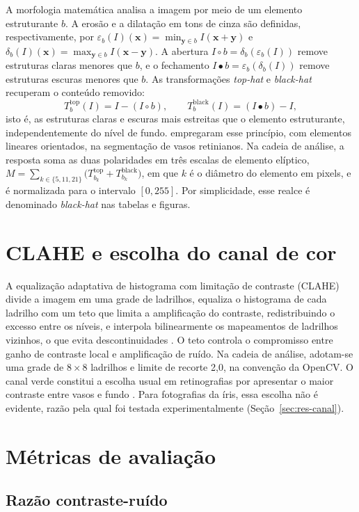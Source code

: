 \documentclass[12pt, oneside, a4paper, chapter=TITLE, section=TITLE,
               english, brazil]{abntex2}
\newcommand{\secao}[1]{\section[\texorpdfstring{\protect\MakeTextUppercase{#1}}{#1}]{#1}}
\newcommand{\bh}{\emph{black-hat}}
\newcommand{\tht}{\emph{top-hat}}
\begin{document}
A morfologia matemática \citep*{Soille2004} analisa a imagem por meio de um
elemento estruturante $b$. A erosão e a dilatação em tons de cinza são
definidas, respectivamente, por
$\varepsilon_b(I)(\mathbf{x}) = \min_{\mathbf{y} \in b} I(\mathbf{x}+\mathbf{y})$
e
$\delta_b(I)(\mathbf{x}) = \max_{\mathbf{y} \in b} I(\mathbf{x}-\mathbf{y})$.
A abertura $I \circ b = \delta_b(\varepsilon_b(I))$ remove estruturas claras
menores que $b$, e o fechamento $I \bullet b = \varepsilon_b(\delta_b(I))$
remove estruturas escuras menores que $b$. As transformações \tht{} e \bh{}
recuperam o conteúdo removido:
\begin{equation}
  T^{\text{top}}_b(I) = I - (I \circ b),
  \qquad
  T^{\text{black}}_b(I) = (I \bullet b) - I,
  \label{eq:tophat}
\end{equation}
isto é, as estruturas claras e escuras mais estreitas que o elemento
estruturante, independentemente do nível de fundo. \citet{ZanaKlein2001}
empregaram esse princípio, com elementos lineares orientados, na segmentação
de vasos retinianos. Na cadeia de análise, a resposta soma as duas
polaridades em três escalas de elemento elíptico,
$M = \sum_{k \in \{5, 11, 21\}} \bigl(T^{\text{top}}_{b_k} + T^{\text{black}}_{b_k}\bigr)$,
em que $k$ é o diâmetro do elemento em pixels, e é normalizada para o
intervalo $[0, 255]$. Por simplicidade, esse realce é denominado \bh{} nas
tabelas e figuras.

\secao{CLAHE e escolha do canal de cor}

A equalização adaptativa de histograma com limitação de contraste (CLAHE)
divide a imagem em uma grade de ladrilhos, equaliza o histograma de cada
ladrilho com um teto que limita a amplificação do contraste, redistribuindo o
excesso entre os níveis, e interpola bilinearmente os mapeamentos de
ladrilhos vizinhos, o que evita descontinuidades
\citep*{Pizer1987,Zuiderveld1994}. O teto controla o compromisso entre ganho
de contraste local e amplificação de ruído. Na cadeia de análise, adotam-se
uma grade de $8\times 8$ ladrilhos e limite de recorte 2,0, na convenção da
OpenCV. O canal verde constitui a escolha usual em retinografias por
apresentar o maior contraste entre vasos e fundo \citep*{Fraz2012}. Para
fotografias da íris, essa escolha não é evidente, razão pela qual foi testada
experimentalmente (Seção~\ref{sec:res-canal}).

\secao{Métricas de avaliação}

\subsection{Razão contraste-ruído}
\end{document}
